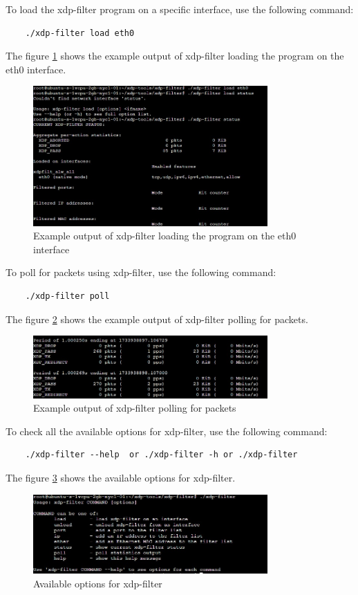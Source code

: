 To load the xdp-filter program on a specific interface, use the following command:
\begin{verbatim}
    ./xdp-filter load eth0
\end{verbatim}
The figure \ref{fig:xdp-filter-load} shows the example output of xdp-filter loading the program on the eth0 interface.
\begin{figure}[H]
    \centering
    \includegraphics[width=0.8\textwidth]{../images/xdp-filter-load-eth0.jpeg}
    \caption{Example output of xdp-filter loading the program on the eth0 interface}
    \label{fig:xdp-filter-load}
\end{figure}

To poll for packets using xdp-filter, use the following command:
\begin{verbatim}
    ./xdp-filter poll
\end{verbatim}
The figure \ref{fig:xdp-filter-poll} shows the example output of xdp-filter polling for packets.
\begin{figure}[H]
    \centering
    \includegraphics[width=0.8\textwidth]{../images/xdp-filter-poll.jpeg}
    \caption{Example output of xdp-filter polling for packets}
    \label{fig:xdp-filter-poll}
\end{figure}

To check all the available options for xdp-filter, use the following command:
\begin{verbatim}
    ./xdp-filter --help  or ./xdp-filter -h or ./xdp-filter
\end{verbatim}
The figure \ref{fig:xdp-filter-help} shows the available options for xdp-filter.
\begin{figure}[H]
    \centering
    \includegraphics[width=0.8\textwidth]{../images/xdp-filter-help.jpeg}
    \caption{Available options for xdp-filter}
    \label{fig:xdp-filter-help}
\end{figure}

